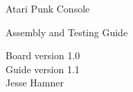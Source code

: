 \documentclass[12pt]{article}
\newcommand{\+}{\item}		%
\newcommand{\revision}{1.0}
\newif\ifkey
\begin{document}
\thispagestyle{empty}
\begin{center}
\begin{Huge}
Atari Punk Console\\
\end{Huge}
\bigskip
\begin{Large}
\ifkey
Assembly, Testing, and Designer's Guide\\
\else
Assembly and Testing Guide\\
\fi

\end{Large}
\bigskip
Board version \revision\\
Guide version 1.1\\
Jesse Hamner\\
\vspace{0.2in}


\end{center}

\tableofcontents

\vfill 
\end{document}
